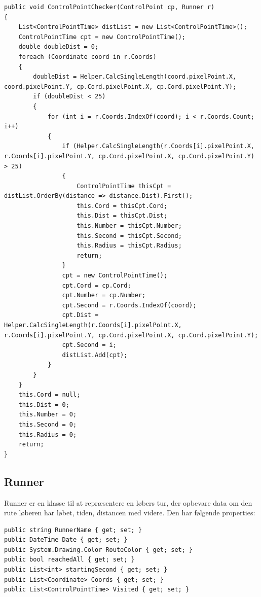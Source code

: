 \begin{lstlisting}
public void ControlPointChecker(ControlPoint cp, Runner r)
{
    List<ControlPointTime> distList = new List<ControlPointTime>();
    ControlPointTime cpt = new ControlPointTime();
    double doubleDist = 0;
    foreach (Coordinate coord in r.Coords)
    {
        doubleDist = Helper.CalcSingleLength(coord.pixelPoint.X, coord.pixelPoint.Y, cp.Cord.pixelPoint.X, cp.Cord.pixelPoint.Y);
        if (doubleDist < 25)
        {
            for (int i = r.Coords.IndexOf(coord); i < r.Coords.Count; i++)
            {
                if (Helper.CalcSingleLength(r.Coords[i].pixelPoint.X, r.Coords[i].pixelPoint.Y, cp.Cord.pixelPoint.X, cp.Cord.pixelPoint.Y) > 25)
                {
                    ControlPointTime thisCpt = distList.OrderBy(distance => distance.Dist).First();
                    this.Cord = thisCpt.Cord;
                    this.Dist = thisCpt.Dist;
                    this.Number = thisCpt.Number;
                    this.Second = thisCpt.Second;
                    this.Radius = thisCpt.Radius;
                    return;
                }
                cpt = new ControlPointTime();
                cpt.Cord = cp.Cord;
                cpt.Number = cp.Number;
                cpt.Second = r.Coords.IndexOf(coord);
                cpt.Dist = Helper.CalcSingleLength(r.Coords[i].pixelPoint.X, r.Coords[i].pixelPoint.Y, cp.Cord.pixelPoint.X, cp.Cord.pixelPoint.Y);
                cpt.Second = i;
                distList.Add(cpt);
            }    
        }
    }
    this.Cord = null;
    this.Dist = 0;
    this.Number = 0;
    this.Second = 0;
    this.Radius = 0;
    return;
}
\end{lstlisting}

\subsection{Runner}
Runner er en klasse til at repræsentere en løbers tur, der opbevare data om den rute løberen har løbet, tiden, distancen med videre. Den har følgende properties:

\begin{lstlisting}
public string RunnerName { get; set; }
public DateTime Date { get; set; }
public System.Drawing.Color RouteColor { get; set; }
public bool reachedAll { get; set; }
public List<int> startingSecond { get; set; }
public List<Coordinate> Coords { get; set; }
public List<ControlPointTime> Visited { get; set; }
\end{lstlisting}

